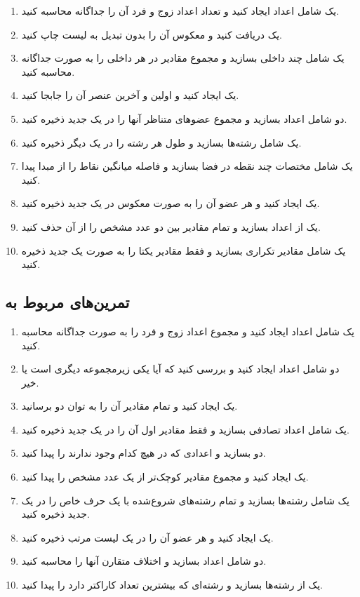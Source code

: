 \documentclass[b5paper,12pt]{article}
\begin{document}
	\begin{enumerate}
		\item یک  شامل اعداد ایجاد کنید و تعداد اعداد زوج و فرد آن را جداگانه محاسبه کنید.
		\item یک  دریافت کنید و معکوس آن را بدون تبدیل به لیست چاپ کنید.
		\item یک  شامل چند  داخلی بسازید و مجموع مقادیر در هر  داخلی را به صورت جداگانه محاسبه کنید.
		\item یک  ایجاد کنید و اولین و آخرین عنصر آن را جابجا کنید.
		\item دو  شامل اعداد بسازید و مجموع عضوهای متناظر آنها را در یک  جدید ذخیره کنید.
		\item یک  شامل رشته‌ها بسازید و طول هر رشته را در یک  دیگر ذخیره کنید.
		\item یک  شامل مختصات چند نقطه در فضا بسازید و فاصله میانگین نقاط را از مبدا پیدا کنید.
		\item یک  ایجاد کنید و هر عضو آن را به صورت معکوس در یک  جدید ذخیره کنید.
		\item یک  از اعداد بسازید و تمام مقادیر بین دو عدد مشخص را از آن حذف کنید.
		\item یک  شامل مقادیر تکراری بسازید و فقط مقادیر یکتا را به صورت یک  جدید ذخیره کنید.
	\end{enumerate}
	
	\subsection*{تمرین‌های مربوط به }
	
	\begin{enumerate}
		\item یک  شامل اعداد ایجاد کنید و مجموع اعداد زوج و فرد را به صورت جداگانه محاسبه کنید.
		\item دو  شامل اعداد ایجاد کنید و بررسی کنید که آیا یکی زیرمجموعه دیگری است یا خیر.
		\item یک  ایجاد کنید و تمام مقادیر آن را به توان دو برسانید.
		\item یک  شامل اعداد تصادفی بسازید و فقط مقادیر اول آن را در یک  جدید ذخیره کنید.
		\item دو  بسازید و اعدادی که در هیچ کدام وجود ندارند را پیدا کنید.
		\item یک  ایجاد کنید و مجموع مقادیر کوچک‌تر از یک عدد مشخص را پیدا کنید.
		\item یک  شامل رشته‌ها بسازید و تمام رشته‌های شروع‌شده با یک حرف خاص را در یک  جدید ذخیره کنید.
		\item یک  ایجاد کنید و هر عضو آن را در یک لیست مرتب ذخیره کنید.
		\item دو  شامل اعداد بسازید و اختلاف متقارن آنها را محاسبه کنید.
		\item یک  از رشته‌ها بسازید و رشته‌ای که بیشترین تعداد کاراکتر دارد را پیدا کنید.
	\end{enumerate}
	
\end{document}
